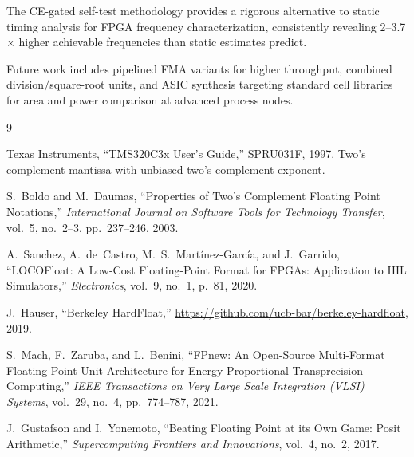 \documentclass[10pt,twocolumn]{article}
\begin{document}
The CE-gated self-test methodology provides a rigorous alternative to
static timing analysis for FPGA frequency characterization, consistently
revealing 2--3.7$\times$ higher achievable frequencies than static
estimates predict.

Future work includes pipelined FMA variants for higher throughput,
combined division/square-root units, and ASIC synthesis targeting
standard cell libraries for area and power comparison at advanced
process nodes.


\begin{thebibliography}{9}

Texas Instruments, ``TMS320C3x User's Guide,'' SPRU031F, 1997.
Two's complement mantissa with unbiased two's complement exponent.

S.~Boldo and M.~Daumas, ``Properties of Two's Complement Floating
Point Notations,'' \emph{International Journal on Software Tools for
Technology Transfer}, vol.~5, no.~2--3, pp.~237--246, 2003.

A.~Sanchez, A.~de~Castro, M.~S.~Mart\'inez-Garc\'ia, and J.~Garrido,
``LOCOFloat: A Low-Cost Floating-Point Format for FPGAs: Application
to HIL Simulators,'' \emph{Electronics}, vol.~9, no.~1, p.~81, 2020.

J.~Hauser, ``Berkeley HardFloat,''
\url{https://github.com/ucb-bar/berkeley-hardfloat}, 2019.

S.~Mach, F.~Zaruba, and L.~Benini, ``FPnew: An Open-Source
Multi-Format Floating-Point Unit Architecture for Energy-Proportional
Transprecision Computing,'' \emph{IEEE Transactions on Very Large Scale
Integration (VLSI) Systems}, vol.~29, no.~4, pp.~774--787, 2021.

J.~Gustafson and I.~Yonemoto, ``Beating Floating Point at its Own
Game: Posit Arithmetic,'' \emph{Supercomputing Frontiers and
Innovations}, vol.~4, no.~2, 2017.

\end{thebibliography}
\end{document}
